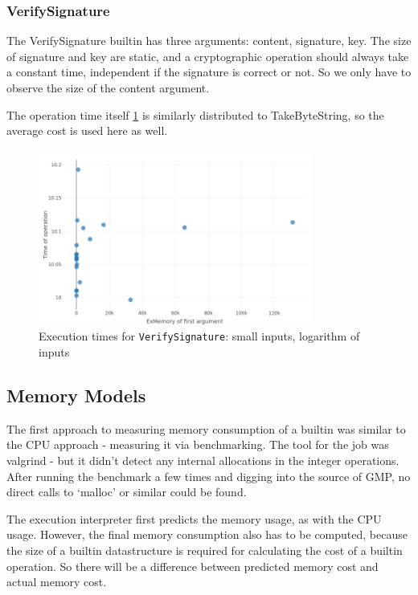 \documentclass[a4paper]{article}
\begin{document}
\subsubsection*{VerifySignature}

The VerifySignature builtin has three arguments: content, signature, key. The
size of signature and key are static, and a cryptographic operation should
always take a constant time, independent if the signature is correct or not. So
we only have to observe the size of the content argument.

The operation time itself \ref{fig:VerifySignature} is similarly distributed to
TakeByteString, so the average cost is used here as well. 

\begin{figure}
\centering
  \includegraphics[width=0.8\textwidth]{figures/VerifySignature.png}
  \caption{Execution times for \texttt{VerifySignature}: small inputs, logarithm of inputs}
  \label{fig:VerifySignature}
\end{figure}

\subsection{Memory Models}

The first approach to measuring memory consumption of a builtin was similar to
the CPU approach - measuring it via benchmarking. The tool for the job was
valgrind - but it didn't detect any internal allocations in the integer
operations. After running the benchmark a few times and digging into the source
of GMP, no direct calls to `malloc' or similar could be found.

The execution interpreter first predicts the memory usage, as with the CPU
usage. However, the final memory consumption also has to be computed, because
the size of a builtin datastructure is required for calculating the cost of a
builtin operation. So there will be a difference between predicted memory cost
and actual memory cost.
\end{document}
